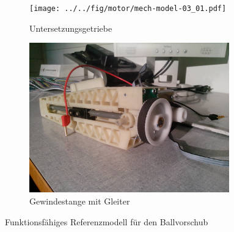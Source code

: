 \begin{figure}[h!]
	\centering
	\begin{subfigure}[t]{0.45\textwidth}
		\centering
		\texttt{[image: ../../fig/motor/mech-model-03\_01.pdf]}
		\caption{Untersetzungsgetriebe}
	\end{subfigure}
	\begin{subfigure}[t]{0.45\textwidth}
		\centering
		\includegraphics[width=0.95\textwidth]{../../fig/motor/mech-model-02.jpg}
		\caption{Gewindestange mit Gleiter}
	\end{subfigure}

	\caption{Funktionsfähiges Referenzmodell für den Ballvorschub}
	\label{fig:refmodel}
\end{figure}

